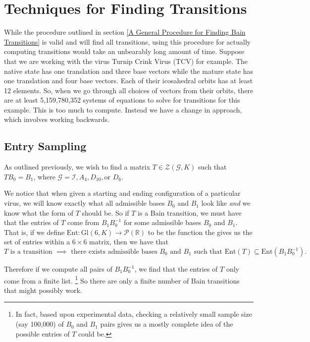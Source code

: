 \documentclass[a4paper,10pt]{article}
\theoremstyle{plain}
\theoremstyle{definition}
\theoremstyle{remark}
\newcommand{\R}{\mathbb{R}}
\newcommand\Gl{\text{Gl}}
\begin{document}
\section{Techniques for Finding Transitions}
While the procedure outlined in section \ref{A General Procedure for Finding Bain Transitions} is valid and will find all transitions, using this procedure for actually computing transitions would take an unbearably long amount of time.
Suppose that we are working with the virus Turnip Crink Virus (TCV) for example.
The native state has one translation and three base vectors while the mature state has one translation and four base vectors.
Each of their icosahedral orbits has at least 12 elements.
So, when we go through all choices of vectors from their orbits, there are at least 5,159,780,352 systems of equations to solve for transitions for this example.
This is too much to compute.
Instead we have a change in approach, which involves working backwards.

\subsection{Entry Sampling}
As outlined  {\color{red} previously}, we wish to find a matrix \(T \in \mathcal{Z}(\mathcal{G}, K)\) such that \(TB_0 = B_1\), where \(\mathcal{G} = \mathcal{I}, A_4, D_{10}, \text{or } D_6\).

We notice that when given a starting and ending configuration of a particular virus, we will know exactly what all admissible bases \(B_0\) and \(B_1\) look like \emph{and} we know what the form of \(T\) should be.
So if \(T\) is a Bain transition, we must have that the entries of \(T\) come from \(B_1B_0^{-1}\) for some admissible bases \(B_0\) and \(B_1\).
That is, if we define \(\text{Ent}\colon \Gl(6, K) \to \mathcal{P}(\R)\) to be the function the gives us the set of entries within a \(6 \times 6\) matrix, then we have that \[T \text{ is a transition } \implies \text{ there exists admissible bases \(B_0\) and \(B_1\) such that } \text{Ent}(T) \subseteq \text{Ent}(B_1B_0^{-1}).\]

Therefore if we compute all pairs of \(B_1B_0^{-1}\), we find that the entries of \(T\) only come from a finite list.
\footnote{In fact, based upon experimental data, checking a relatively small sample size (say 100,000) of \(B_0\) and \(B_1\) pairs gives us a mostly complete idea of the possible entries of \(T\) could be.}
So there are only a finite number of Bain transitions that might possibly work.
\end{document}
